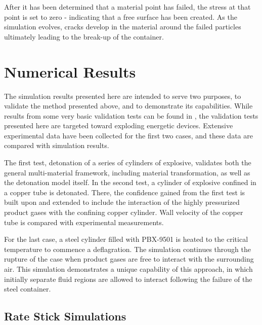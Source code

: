  After it has been determined that a material point has failed, the stress
  at that point is set to zero - indicating that a free surface has been 
  created.  As the simulation evolves, cracks develop in the material around
  the failed particles ultimately leading to the break-up of the container.
  
 
\section{Numerical Results}\label{sec:numerical_results}

  The simulation results presented here are intended to serve two purposes, to 
  validate the method presented above, and to demonstrate its 
  capabilities.  While results from some very basic validation tests can be 
  found in \cite{Guilkey2005}, the validation tests presented here are 
  targeted toward exploding energetic devices.  Extensive experimental data have
  been collected for the first two cases, and these data are compared with 
  simulation results.  
  
  The first test, detonation of a series of cylinders of explosive, validates 
  both the general multi-material framework, including material 
  transformation, as well as the detonation model itself.  In the second 
  test, a cylinder of explosive confined in a copper tube is 
  detonated.  There, the confidence gained from the 
  first test is built upon and extended to include the interaction of the highly
  pressurized product gases with the confining copper cylinder.  Wall velocity 
  of the copper tube is compared with experimental measurements.

  For the last case, a steel cylinder filled with PBX-9501 is heated to the 
  critical temperature to commence a deflagration.  The simulation continues 
  through the rupture of the case when product gases are 
  free to interact with the surrounding air.  This simulation demonstrates a 
  unique capability of this approach, in which initially separate fluid 
  regions are allowed to interact following the failure of the steel container.

\subsection{Rate Stick Simulations}

